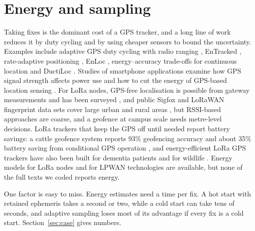\documentclass[preprint,12pt]{elsarticle}
\begin{document}
\section{Energy and sampling}\label{sec:energy}
Taking fixes is the dominant cost of a GPS tracker, and a long line of work reduces it by duty cycling and by using cheaper sensors to bound the uncertainty. Examples include adaptive GPS duty cycling with radio ranging \cite{jurdak2010adaptive}, EnTracked \cite{kjaergaard2009entracked}, rate-adaptive positioning \cite{paek2010raps}, EnLoc \cite{constandache2009enloc}, energy--accuracy trade-offs for continuous location \cite{lin2010aloc} and DuctiLoc \cite{katsikouli2023ductiloc}. Studies of smartphone applications examine how GPS signal strength affects power use and how to cut the energy of GPS-based location sensing \cite{tawalbeh2016greener,oshin2012improving}. For LoRa nodes, GPS-free localisation is possible from gateway measurements \cite{fargas2017gpsfree} and has been surveyed \cite{gu2018lora,tahaei2025overview,janssen2023survey,moradbeikie2021gnss}, and public Sigfox and LoRaWAN fingerprint data sets cover large urban and rural areas \cite{aernouts2018sigfox}, but RSSI-based approaches are coarse, and a geofence at campus scale needs metre-level decisions. LoRa trackers that keep the GPS off until needed report battery savings: a cattle geofence system reports 93\% geofencing accuracy and about 35\% battery saving from conditional GPS operation \cite{j2026fencing}, and energy-efficient LoRa GPS trackers have also been built for dementia patients and for wildlife \cite{hadwen2017dementia,lopezescobar2025wildlife}. Energy models for LoRa nodes \cite{bouguera2018energy,casals2017energy} and for LPWAN technologies \cite{singh2020energy} are available, but none of the full texts we coded reports energy.

One factor is easy to miss. Energy estimates need a time per fix. A hot start with retained ephemeris takes a second or two, while a cold start can take tens of seconds, and adaptive sampling loses most of its advantage if every fix is a cold start. Section~\ref{sec:case} gives numbers.

\end{document}
